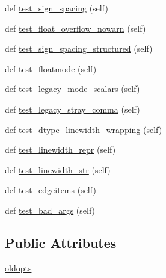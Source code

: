 \begin{DoxyCompactItemize}
def \hyperlink{classnumpy_1_1core_1_1tests_1_1test__arrayprint_1_1TestPrintOptions_a2b3931adf3c2bd5bd8083ef806b7db1a}{test\+\_\+sign\+\_\+spacing} (self)
\item 
def \hyperlink{classnumpy_1_1core_1_1tests_1_1test__arrayprint_1_1TestPrintOptions_a13f0ed941beee870d5e5ad9941e334be}{test\+\_\+float\+\_\+overflow\+\_\+nowarn} (self)
\item 
def \hyperlink{classnumpy_1_1core_1_1tests_1_1test__arrayprint_1_1TestPrintOptions_ac1b0a46d9fe9af55589a5d194a2ebe42}{test\+\_\+sign\+\_\+spacing\+\_\+structured} (self)
\item 
def \hyperlink{classnumpy_1_1core_1_1tests_1_1test__arrayprint_1_1TestPrintOptions_a272e46265a7a0debc07f18d7acc9b8de}{test\+\_\+floatmode} (self)
\item 
def \hyperlink{classnumpy_1_1core_1_1tests_1_1test__arrayprint_1_1TestPrintOptions_a225094f22b9b5b43e5d326e3c420dda4}{test\+\_\+legacy\+\_\+mode\+\_\+scalars} (self)
\item 
def \hyperlink{classnumpy_1_1core_1_1tests_1_1test__arrayprint_1_1TestPrintOptions_a3c61138b897f74a0ce7fe60fb697377a}{test\+\_\+legacy\+\_\+stray\+\_\+comma} (self)
\item 
def \hyperlink{classnumpy_1_1core_1_1tests_1_1test__arrayprint_1_1TestPrintOptions_a2d648769da2308aa17e8ce22a84bf1f3}{test\+\_\+dtype\+\_\+linewidth\+\_\+wrapping} (self)
\item 
def \hyperlink{classnumpy_1_1core_1_1tests_1_1test__arrayprint_1_1TestPrintOptions_a0ce21e7b3224b1b1157d6fdc078b78ad}{test\+\_\+linewidth\+\_\+repr} (self)
\item 
def \hyperlink{classnumpy_1_1core_1_1tests_1_1test__arrayprint_1_1TestPrintOptions_a3ca000f4022e2265c78e2abf593882ce}{test\+\_\+linewidth\+\_\+str} (self)
\item 
def \hyperlink{classnumpy_1_1core_1_1tests_1_1test__arrayprint_1_1TestPrintOptions_abda732425aa48910a47380469b0131c5}{test\+\_\+edgeitems} (self)
\item 
def \hyperlink{classnumpy_1_1core_1_1tests_1_1test__arrayprint_1_1TestPrintOptions_a3d7c4f2abddeb5316a245bf49a319ffe}{test\+\_\+bad\+\_\+args} (self)
\end{DoxyCompactItemize}
\subsection*{Public Attributes}
\begin{DoxyCompactItemize}
\item 
\hyperlink{classnumpy_1_1core_1_1tests_1_1test__arrayprint_1_1TestPrintOptions_a25037b00df96763af6e1dc64996dbb01}{oldopts}
\end{DoxyCompactItemize}


